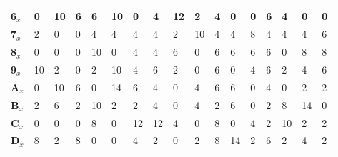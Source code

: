 \begin{longtable}[c]{|l|l|l|l|l|l|l|l|l|l|l|l|l|l|l|l|l|}
\textbf{6$_x$}  & 0              & 10             & 6              & 6              & 10             & 0              & 4              & 12             & 2              & 4              & 0              & 0              & 6              & 4              & 0              & 0              \\ \hline
\textbf{7$_x$}  & 2              & 0              & 0              & 4              & 4              & 4              & 4              & 2              & 10             & 4              & 4              & 8              & 4              & 4              & 4              & 6              \\ \hline
\textbf{8$_x$}  & 0              & 0              & 0              & 10             & 0              & 4              & 4              & 6              & 0              & 6              & 6              & 6              & 6              & 0              & 8              & 8              \\ \hline
\textbf{9$_x$}  & 10             & 2              & 0              & 2              & 10             & 4              & 6              & 2              & 0              & 6              & 0              & 4              & 6              & 2              & 4              & 6              \\ \hline
\textbf{A$_x$}  & 0              & 10             & 6              & 0              & 14             & 6              & 4              & 0              & 4              & 6              & 6              & 0              & 4              & 0              & 2              & 2              \\ \hline
\textbf{B$_x$}  & 2              & 6              & 2              & 10             & 2              & 2              & 4              & 0              & 4              & 2              & 6              & 0              & 2              & 8              & 14             & 0              \\ \hline
\textbf{C$_x$}  & 0              & 0              & 0              & 8              & 0              & 12             & 12             & 4              & 0              & 8              & 0              & 4              & 2              & 10             & 2              & 2              \\ \hline
\textbf{D$_x$}  & 8              & 2              & 8              & 0              & 0              & 4              & 2              & 0              & 2              & 8              & 14             & 2              & 6              & 2              & 4              & 2              \\ \hline

\end{longtable}
